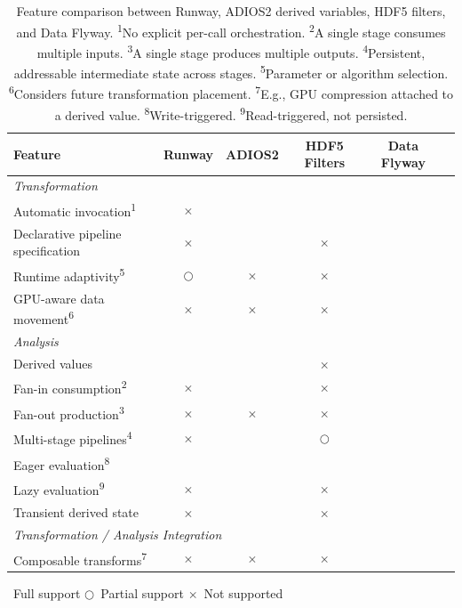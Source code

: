 {\color{red}
\newcommand{\Full}{\textcolor{fullsupport}{\checkmark}}
\newcommand{\Partial}{\textcolor{partialsupport}{$\bigcirc$}}
\newcommand{\None}{$\times$}
\begin{table}[t]
\centering
\footnotesize
\begin{tabular}{p{5.2cm}ccccc}
\hline
\textbf{Feature} & \textbf{Runway} & \textbf{ADIOS2} & \textbf{HDF5 Filters} & \textbf{Data Flyway} \\
\hline
\multicolumn{5}{l}{\textit{Transformation}} \\
\hline
Automatic invocation\textsuperscript{1} & \None & \Full & \Full & \Full \\
Declarative pipeline specification & \None & \Full & \None & \Full \\
Runtime adaptivity\textsuperscript{5} & \Partial & \None & \None & \Full \\
GPU-aware data movement\textsuperscript{6} & \None & \None & \None & \Full \\
\hline
\multicolumn{5}{l}{\textit{Analysis}} \\
\hline
Derived values & \Full & \Full & \None & \Full \\
Fan-in consumption\textsuperscript{2} & \None & \Full & \None & \Full \\
Fan-out production\textsuperscript{3} & \None & \None & \None & \Full \\
Multi-stage pipelines\textsuperscript{4} & \None & \Full & \Partial & \Full \\
Eager evaluation\textsuperscript{8} & \Full & \Full & \Full & \Full \\
Lazy evaluation\textsuperscript{9} & \None & \Full & \None & \Full \\
Transient derived state & \None & \Full & \None & \Full \\
\hline
\multicolumn{5}{l}{\textit{Transformation / Analysis Integration}} \\
\hline
Composable transforms\textsuperscript{7} & \None & \None & \None & \Full \\
\hline
\end{tabular}
\vspace{2pt}

\footnotesize \Full\ Full support \quad \Partial\ Partial support \quad \None\ Not supported

\caption{Feature comparison between Runway, ADIOS2 derived variables, HDF5 filters, and Data Flyway.
\textsuperscript{1}No explicit per-call orchestration.
\textsuperscript{2}A single stage consumes multiple inputs.
\textsuperscript{3}A single stage produces multiple outputs.
\textsuperscript{4}Persistent, addressable intermediate state across stages.
\textsuperscript{5}Parameter or algorithm selection.
\textsuperscript{6}Considers future transformation placement.
\textsuperscript{7}E.g., GPU compression attached to a derived value.
\textsuperscript{8}Write-triggered.
\textsuperscript{9}Read-triggered, not persisted.}
\label{tab:runway-comparison}
\end{table}
}

